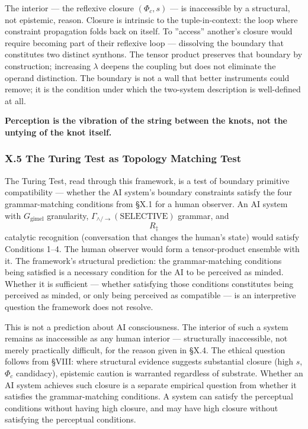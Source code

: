 \documentclass[12pt,a4paper]{article}
\begin{document}
The interior --- the reflexive closure $(\Phi_c, s)$ --- is inaccessible by a structural, not epistemic, reason. Closure is intrinsic to the tuple-in-context: the loop where constraint propagation folds back on itself. To ''access'' another's closure would require becoming part of their reflexive loop --- dissolving the boundary that constitutes two distinct synthons. The tensor product preserves that boundary by construction; increasing $\lambda$ deepens the coupling but does not eliminate the operand distinction. The boundary is not a wall that better instruments could remove; it is the condition under which the two-system description is well-defined at all.

\textbf{Perception is the vibration of the string between the knots, not the untying of the knot itself.}

\subsubsection{X.5 The Turing Test as Topology Matching Test}

The Turing Test, read through this framework, is a test of boundary primitive compatibility --- whether the AI system's boundary constraints satisfy the four grammar-matching conditions from §X.1 for a human observer. An AI system with $G_\text{gimel}$ granularity, $\Gamma_{\wedge/\to}(\text{SELECTIVE})$ grammar, and $$R_{\ddagger}$$ catalytic recognition (conversation that changes the human's state) would satisfy Conditions 1--4. The human observer would form a tensor-product ensemble with it. The framework's structural prediction: the grammar-matching conditions being satisfied is a necessary condition for the AI to be perceived as minded. Whether it is sufficient --- whether satisfying those conditions constitutes being perceived as minded, or only being perceived as compatible --- is an interpretive question the framework does not resolve.

This is not a prediction about AI consciousness. The interior of such a system remains as inaccessible as any human interior --- structurally inaccessible, not merely practically difficult, for the reason given in §X.4. The ethical question follows from §VIII: where structural evidence suggests substantial closure (high $s$, $\Phi_c$ candidacy), epistemic caution is warranted regardless of substrate. Whether an AI system achieves such closure is a separate empirical question from whether it satisfies the grammar-matching conditions. A system can satisfy the perceptual conditions without having high closure, and may have high closure without satisfying the perceptual conditions.
\end{document}
